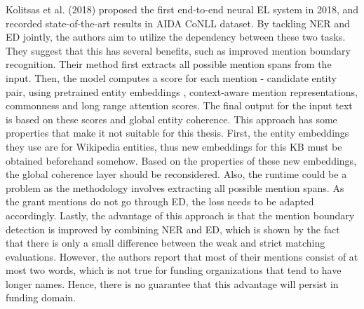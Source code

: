 \documentclass{report}
\theoremstyle{definition}
\theoremstyle{remark}
\begin{document}
Kolitsas et al. (2018) \cite{kolitsas} proposed the first end-to-end neural EL system in 2018, and recorded state-of-the-art results in AIDA CoNLL dataset. By tackling NER and ED jointly, the authors aim to utilize the dependency between these two tasks. They suggest that this has several benefits, such as improved mention boundary recognition. Their method first extracts all possible mention spans from the input. Then, the model computes a score for each mention - candidate entity pair, using pretrained entity embeddings \cite{kolitsasEmbed}, context-aware mention representations, commonness and long range attention scores. The final output for the input text is based on these scores and global entity coherence. This approach has some properties that make it not suitable for this thesis. First, the entity embeddings they use are for Wikipedia entities, thus new embeddings for this KB must be obtained beforehand somehow. Based on the properties of these new embeddings, the global coherence layer should be reconsidered. Also, the runtime could be a problem as the methodology involves extracting all possible mention spans. As the grant mentions do not go through ED, the loss needs to be adapted accordingly. Lastly, the advantage of this approach is that the mention boundary detection is improved by combining NER and ED, which is shown by the fact that there is only a small difference between the weak and strict matching evaluations. However, the authors report that most of their mentions consist of at most two words, which is not true for funding organizations that tend to have longer names. Hence, there is no guarantee that this advantage will persist in funding domain.
\end{document}
